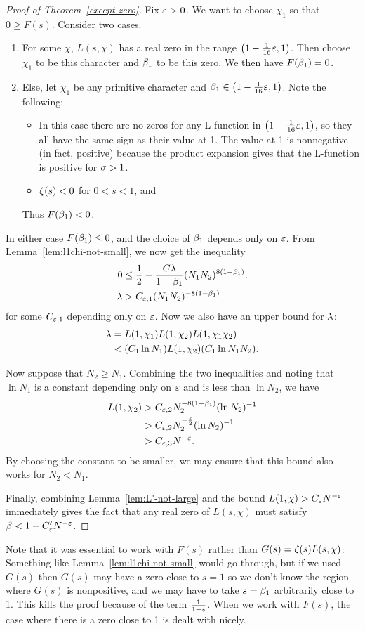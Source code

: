 \begin{proof}[Proof of Theorem~\ref{except-zero}]
Fix $\varepsilon>0$. 
We want to choose $\chi_1$ so that $0\ge F(s)$. Consider two cases.
\begin{enumerate}
\item
For some $\chi$, $L(s,\chi)$ has a real zero in the range $\left( {1-\frac{1}{16}\varepsilon,1} \right)$. Then choose $\chi_1$ to be this character and $\beta_1$ to be this zero. We then have $F(\beta_1)=0$.
\item
Else, let $\chi_1$ be any primitive character and $\beta_1\in \left( {1-\frac{1}{16}\varepsilon,1} \right)$. Note the following:
\begin{itemize}
\item
In this case there are no zeros for any L-function in $\left( {1-\frac{1}{16}\varepsilon,1} \right)$, so they all have the same sign as their value at 1. The value at 1 is nonnegative (in fact, positive) because the product expansion gives that the L-function is positive for $\sigma>1$.
\item $\zeta(s)<0$ for $0<s<1$, and 
\end{itemize}
Thus $F(\beta_1)< 0$.
\end{enumerate}
In either case $F(\beta_1)\le 0$, and the choice of $\beta_1$ depends only on $\varepsilon$. 
From Lemma~\ref{lem:l1chi-not-small}, we now get the inequality
\begin{align*}
0&\le \frac{1}{2}-\frac{C\lambda}{1-\beta_1}(N_1N_2)^{8(1-\beta_1)}.\\
\lambda&> C_{\varepsilon,1}(N_1N_2)^{-8(1-\beta_1)}
\end{align*}
for some $C_{\varepsilon,1}$ depending only on $\varepsilon$. Now we also have an upper bound for $\lambda$:
\begin{align*}
\lambda &=L(1,\chi_1)L(1,\chi_2)L(1,\chi_1\chi_2)\\
&<(C_1\ln N_1)L(1,\chi_2)(C_1\ln N_1N_2).
\end{align*}

Now suppose that $N_2\ge N_1$. 
Combining the two inequalities and noting that $\ln N_1$ is a constant depending only on $\varepsilon$ and is less than $\ln N_2$, we have
\begin{align*}
L(1,\chi_2)&>C_{\varepsilon,2}N_2^{-8(1-\beta_1)}(\ln N_2)^{-1}\\
&>C_{\varepsilon,2}N_2^{-\frac{\varepsilon}{2}}(\ln N_2)^{-1}\\
&>C_{\varepsilon,3}N^{-\varepsilon}.
\end{align*}
By choosing the constant to be smaller, we may ensure that this bound also works for $N_2<N_1$.

Finally, combining Lemma~\ref{lem:L'-not-large} and the bound $L(1,\chi)>C_{\varepsilon}N^{-\varepsilon}$ immediately gives the fact that any real zero of $L(s,\chi)$ must satisfy $\beta<1-C'_{\varepsilon}N^{-\varepsilon}$.
\end{proof}
Note that it was essential to work with $F(s)$ rather than $G(s)=\zeta(s)L(s,\chi)$: Something like Lemma~\ref{lem:l1chi-not-small} would go through, but if we used $G(s)$ then $G(s)$ may have a zero close to $s=1$ so we don't know the region where $G(s)$ is nonpositive, and we may have to take $s=\beta_1$ arbitrarily close to 1. This kills the proof because of the term $\frac{1}{1-s}$. When we work with $F(s)$, the case where there is a zero close to 1 is dealt with nicely.
